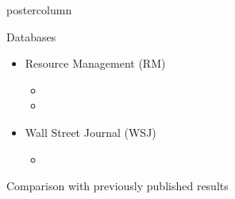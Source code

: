 \documentclass[final,hyperref={pdfpagelabels=false}]{beamer}
\begin{document}
\begin{frame}
\begin{columns}
\begin{column}{.49\textwidth}
\begin{beamercolorbox}[center,wd=\textwidth]{postercolumn}
\begin{minipage}[T]{.95\textwidth}
{            \begin{block}{Databases}
              \begin{itemize}
              \item Resource Management (RM)
                \begin{itemize}
                \item 
                \item 
                \end{itemize}
              \item Wall Street Journal (WSJ)
                \begin{itemize}
                \item
                \end{itemize}
              \end{itemize}
            \end{block}
            \vfill
            \begin{block}{Comparison with previously published results}
              \begin{columns}
                \begin{column}{.5\textwidth}
                  \begin{table}
                    \small
                    \centering
                    \begin{tabular}{@{} l @{} c c@{}}

\end{tabular}
\end{table}
\end{column}
\end{columns}
\end{block}}
\end{minipage}
\end{beamercolorbox}
\end{column}
\end{columns}
\end{frame}
\end{document}
